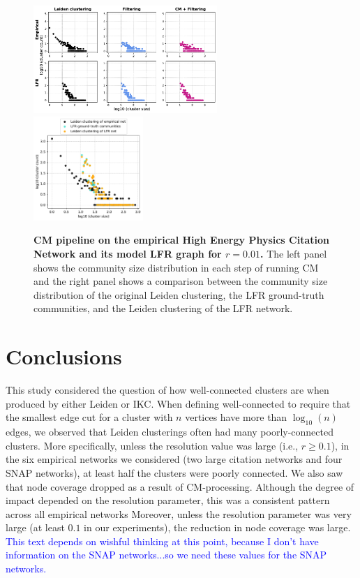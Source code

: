 \documentclass[11pt]{article}   	%
\begin{document}
\begin{figure}[h!]
\centering
\includegraphics[width=0.62\textwidth]{figs/cit_hepph_cm_steps_lfr01.pdf}
\includegraphics[width=0.37\textwidth]{figs/cit_hepph_01_cm_size.pdf}
\caption[CM pipeline on the empirical High Energy Physics Citation network and its model LFR graph for r=0.01]{\textbf{CM pipeline on the empirical High Energy Physics Citation Network and its model LFR graph for $r=0.01$.} The left panel shows the community size distribution in each step of running CM and the right panel shows a comparison between the community size distribution of the original Leiden clustering, the LFR ground-truth communities, and the Leiden clustering of the LFR network.}
\label{fig:hepph-cm-lfr-01}
\end{figure}

\section{Conclusions}
This study considered the question of how well-connected clusters are when produced by either Leiden or IKC.
When defining well-connected to require  that the smallest edge cut for a cluster with $n$ vertices  have more than $\log_{10}(n)$ edges, we observed that Leiden clusterings
often had many poorly-connected clusters. More specifically, unless the resolution value was large (i.e., $r \geq 0.1$), in the six empirical networks we
considered (two large citation networks and four SNAP networks), at least half the clusters were poorly connected.
We also saw that node coverage dropped as a result of CM-processing.
Although the degree of impact depended on the resolution parameter, this was a consistent pattern across all empirical networks
Moreover, unless the resolution parameter was very large (at least $0.1$ in our experiments), the reduction in node coverage was large.
\textcolor{blue}{This text depends on wishful thinking at this point, because I don't have information on the SNAP networks...so we need these values for the SNAP networks.}
\end{document}
